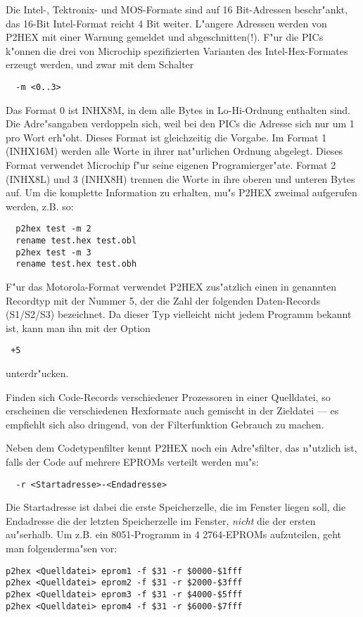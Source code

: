 \documentclass[12pt,a4paper,twoside]{report}
\newcommand{\ii}[1]{{\it #1}}
\begin{document}
Die Intel-, Tektronix- und MOS-Formate sind auf 16 Bit-Adressen
beschr"ankt, das 16-Bit Intel-Format reicht 4 Bit weiter.  L"angere
Adressen werden von P2HEX mit einer Warnung gemeldet und abgeschnitten(!).
F"ur die PICs k"onnen die drei von Microchip spezifizierten Varianten des
Intel-Hex-Formates erzeugt werden, und zwar mit dem Schalter
\begin{verbatim}
  -m <0..3>
\end{verbatim}
Das Format 0 ist INHX8M, in dem alle Bytes in Lo-Hi-Ordnung enthalten
sind.  Die Adre"sangaben verdoppeln sich, weil bei den PICs die Adresse
sich nur um 1 pro Wort erh"oht.  Dieses Format ist gleichzeitig die Vorgabe.
Im Format 1 (INHX16M) werden alle Worte in ihrer nat"urlichen Ordnung
abgelegt.  Dieses Format verwendet Microchip f"ur seine eigenen
Programierger"ate.  Format 2 (INHX8L) und 3 (INHX8H) trennen die Worte
in ihre oberen und unteren Bytes auf.  Um die komplette Information zu
erhalten, mu"s P2HEX zweimal aufgerufen werden, z.B. so:
\begin{verbatim}
  p2hex test -m 2
  rename test.hex test.obl
  p2hex test -m 3
  rename test.hex test.obh
\end{verbatim}
F"ur das Motorola-Format verwendet P2HEX zus"atzlich einen in \cite{CPM68K}
genannten Recordtyp mit der Nummer 5, der die Zahl der folgenden
Daten-Records (S1/S2/S3) bezeichnet.  Da dieser Typ vielleicht nicht jedem
Programm bekannt ist, kann man ihn mit der Option
\begin{verbatim}
 +5
\end{verbatim}
unterdr"ucken.
\par
Finden sich Code-Records verschiedener Prozessoren in einer Quelldatei,
so erscheinen die verschiedenen Hexformate auch gemischt in der Zieldatei
--- es empfiehlt sich also dringend, von der Filterfunktion Gebrauch zu
machen.
\par
Neben dem Codetypenfilter kennt P2HEX noch ein Adre"sfilter, das n"utzlich
ist, falls der Code auf mehrere EPROMs verteilt werden mu"s:
\begin{verbatim}
  -r <Startadresse>-<Endadresse>
\end{verbatim}
Die Startadresse ist dabei die erste Speicherzelle, die im Fenster liegen
soll, die Endadresse die der letzten Speicherzelle im Fenster, \ii{nicht}
die der ersten au"serhalb.  Um z.B. ein 8051-Programm in 4 2764-EPROMs
aufzuteilen, geht man folgenderma"sen vor:
\begin{verbatim}
p2hex <Quelldatei> eprom1 -f $31 -r $0000-$1fff
p2hex <Quelldatei> eprom2 -f $31 -r $2000-$3fff
p2hex <Quelldatei> eprom3 -f $31 -r $4000-$5fff
p2hex <Quelldatei> eprom4 -f $31 -r $6000-$7fff
\end{verbatim}
\end{document}

